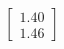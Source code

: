 \documentclass[preview]{standalone}
\begin{document}
\begin{align*}
\begin{bmatrix} 1.40 \\ 1.46 \end{bmatrix}
\end{align*}
\end{document}
